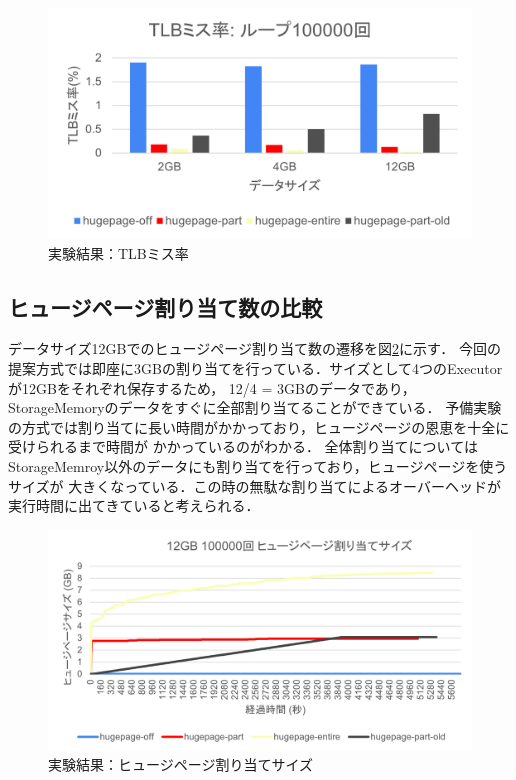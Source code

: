 \begin{figure}
  \centering
  \includegraphics[scale=0.6]{figures/experiment-new/storagememory/tlb-miss-100000.png}
  \caption{実験結果：TLBミス率}
  \label{fig:storagememory-tlb-miss-100000}
\end{figure}

\subsection{ヒュージページ割り当て数の比較}
データサイズ12GBでのヒュージページ割り当て数の遷移を図\ref{fig:storagememory-throughput-hugepage-4g-100000}に示す．
今回の提案方式では即座に3GBの割り当てを行っている．サイズとして4つのExecutorが12GBをそれぞれ保存するため，
12/4 = 3GBのデータであり，StorageMemoryのデータをすぐに全部割り当てることができている．
予備実験の方式では割り当てに長い時間がかかっており，ヒュージページの恩恵を十全に受けられるまで時間が
かかっているのがわかる．
全体割り当てについてはStorageMemroy以外のデータにも割り当てを行っており，ヒュージページを使うサイズが
大きくなっている．この時の無駄な割り当てによるオーバーヘッドが実行時間に出てきていると考えられる．

\begin{figure}[H]
  \centering
  \includegraphics[scale=0.5]{figures/experiment-new/storagememory/throughput-hugepage-4g-100000.png}
  \caption{実験結果：ヒュージページ割り当てサイズ}
  \label{fig:storagememory-throughput-hugepage-4g-100000}
\end{figure}

